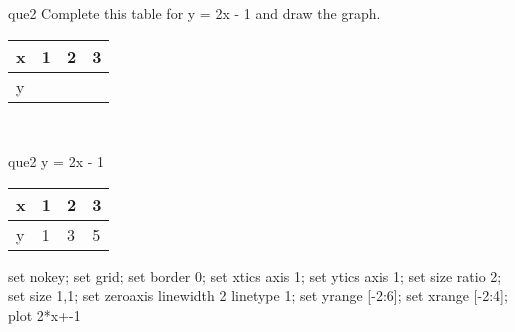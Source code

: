 \documentclass[13.5pt, varwidth=true]{beamer}
\begin{document}
\begin{frame}[shrink=19,fragile]
	\begin{beamercolorbox}[rounded=true, left, shadow=true,wd=14.8cm]{que2}
		 Complete this table for y = 2x - 1 and draw the graph. \\[0.3cm] \renewcommand{\arraystretch}{1.2}\begin{tabular}{|C|C|C|C|} \hline x & 1 & 2 & 3 \\ \hline y & & & \\ \hline \end{tabular}\\[0.3cm]
	\end{beamercolorbox}
\end{frame}
\begin{frame}[shrink=19,fragile]
	\begin{beamercolorbox}[rounded=true, left, shadow=true,wd=14.8cm]{que2}
 		y = 2x - 1\renewcommand{\arraystretch}{1.2}\begin{tabular}{|C|C|C|C|} \hline x & 1 & 2 & 3 \\ \hline y & 1 & 3 & 5\\ \hline \end{tabular}\begin{gnuplot}[terminal=pdf] set nokey; set grid; set border 0; set xtics axis 1; set ytics axis 1; set size ratio 2; set size 1,1; set zeroaxis linewidth 2 linetype 1; set yrange [-2:6]; set xrange [-2:4]; plot 2*x+-1 \end{gnuplot}
	\end{beamercolorbox}
\end{frame}
\end{document}
